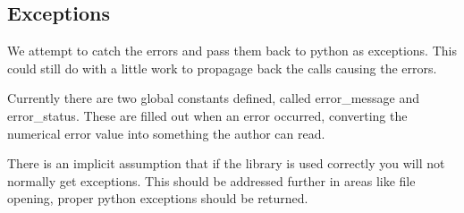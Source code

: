\documentclass[10pt,a4paper,twoside,notitlepage]{article}
\begin{document}
\subsection{Exceptions}

We attempt to catch the errors and pass them back to python as 
exceptions. This could still do with a little work to propagage
back the calls causing the errors.

Currently there are two global  constants defined, called error\_message
and error\_status. 
These are filled out when an error occurred, converting the numerical
error value into something the author can read.

There is an implicit assumption that if the library is used 
correctly you will not normally get exceptions. 
This should be addressed further in areas like file opening,
proper python exceptions should be returned.
\end{document}
